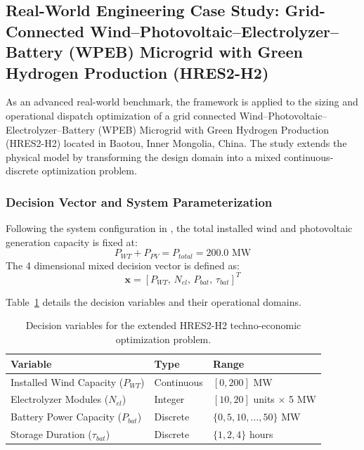 \documentclass[review]{elsarticle}
\begin{document}
\subsection{Real-World Engineering Case Study: Grid-Connected Wind--Photovoltaic--Electrolyzer--Battery (WPEB) Microgrid with Green Hydrogen Production (HRES2-H2)}
\label{sec:hres2_case_study}

As an advanced real-world benchmark, the framework is applied to the sizing and operational dispatch optimization of a grid connected Wind--Photovoltaic--Electrolyzer--Battery (WPEB) Microgrid with Green Hydrogen Production (HRES2-H2) located in Baotou, Inner Mongolia, China. The study extends the physical model \cite{li2024capacity}  by transforming the design domain into a mixed continuous-discrete optimization problem.

\subsubsection{Decision Vector and System Parameterization}

Following the system configuration in \cite{li2024capacity}, the total installed wind and photovoltaic generation capacity is fixed at:
\begin{equation}
P_{WT} + P_{PV} = P_{total} = 200.0 \text{ MW}
\label{eq:generation_constraint}
\end{equation}
The 4 dimensional mixed decision vector is defined as:
\begin{equation}
\mathbf{x} = \left[ P_{WT},\, N_{el},\, P_{bat},\, \tau_{bat} \right]^T
\label{eq:hres2_decision_vector}
\end{equation} 

Table~\ref{tab:hres2_decision_vars} details the decision variables and their operational domains.


\begin{table}[htbp]
\centering
\caption{Decision variables for the extended HRES2-H2 techno-economic optimization problem.}
\label{tab:hres2_decision_vars}
\vspace{2mm}
\begin{tabular}{lll}
\toprule
\textbf{Variable} & \textbf{Type} & \textbf{Range} \\
\midrule
Installed Wind Capacity ($P_{WT}$) & Continuous & $[0, 200]$ MW \\
 Electrolyzer Modules ($N_{el}$) & Integer & $[10, 20]$ units $\times$ 5 MW \\
Battery Power Capacity ($P_{bat}$) & Discrete & $\{0, 5, 10, \dots, 50\}$ MW \\
Storage Duration ($\tau_{bat}$) & Discrete & $\{1, 2, 4\}$ hours \\
\bottomrule
\end{tabular}
\end{table}
\end{document}
